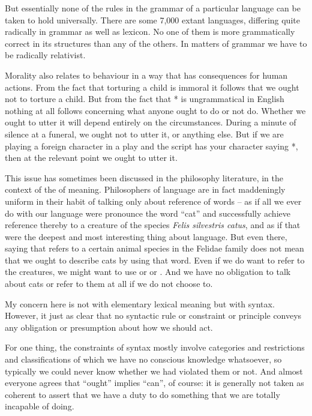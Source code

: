 \documentclass[output=paper]{langscibook}
\begin{document}
But essentially none of the rules in the grammar of a particular language can be taken to hold universally. There are some 7,000 extant languages, differing quite radically in grammar as well as lexicon.  No one of them is more grammatically correct in its structures than any of the others. In matters of grammar we have to be radically relativist.

Morality also relates to behaviour in a way that has consequences for human actions.  From the fact that torturing a child is immoral it follows that we ought not to torture a child.  But from the fact that * is ungrammatical in English nothing at all follows concerning what anyone ought to do or not do.  Whether we ought to utter it will depend entirely on the circumstances.  During a minute of silence at a funeral, we ought not to utter it, or anything else.  But if we are playing a foreign character in a play and the script has your character saying *, then at the relevant point we ought to utter it.

This issue has sometimes been discussed in the philosophy literature, in the context of the  of meaning.  Philosophers of language are in fact maddeningly uniform in their habit of talking only about reference of words -- as if all we ever do with our language were pronounce the word ``cat'' and successfully achieve reference thereby to a creature of the species \textit{Felis silvestris catus}, and as if that were the deepest and most interesting thing about language.  But even there, saying that  refers to a certain animal species in the Felidae family does not mean that we ought to describe cats by using that word.  Even if we do want to refer to the creatures, we might want to use  or  or .  And we have no obligation to talk about cats or refer to them at all if we do not choose to.

My concern here is not with elementary lexical meaning but with syntax. However, it just as clear that no syntactic rule or constraint or principle conveys any obligation or presumption about how we should act.

For one thing, the constraints of syntax mostly involve categories and restrictions and classifications of which we have no conscious knowledge whatsoever, so typically we could never know whether we had violated them or not.  And almost everyone agrees that ``ought'' implies ``can'', of course: it is generally not taken as coherent to assert that we have a duty to do something that we are totally incapable of doing.
\end{document}

